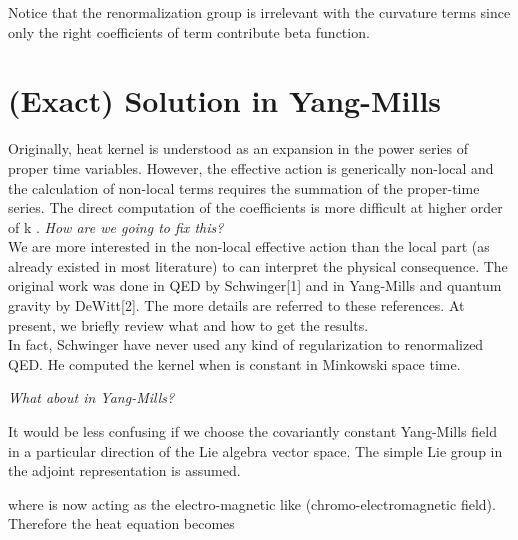 \documentclass[a4paper,12 pt]{article}
\begin{document}
Notice that the renormalization group is irrelevant with the
curvature terms since only the right coefficients of
\coordHE{} term contribute beta function.
\section{(Exact) Solution in Yang-Mills}
Originally, heat kernel is understood as an expansion in the power
series of proper time variables. However, the effective action is
generically non-local and the calculation of non-local terms
requires the summation of the proper-time series. The direct
computation of the coefficients \coordHE{} is more difficult at
higher order of k . \emph{How are we going to fix this?} \\We are
more interested in the non-local effective action than the local
part (as already existed in most literature) to can interpret the
physical consequence. The original work was done in QED by
Schwinger[1] and in Yang-Mills and quantum gravity by DeWitt[2].
The more details are referred to these references. At present, we
briefly review what and how to get the results.
\\In fact, Schwinger have never used any kind of regularization to
renormalized QED.  He computed the kernel \coordHE{} when \coordHE{} is constant in Minkowski space time.
\begin{center}
\coordHE{}
\end{center}
\begin{center}
\emph{What about in Yang-Mills?}
\end{center}
It would be less confusing if we choose the covariantly constant
Yang-Mills field \coordHE{} in a particular direction of
the Lie algebra vector space. The simple Lie group in the adjoint
representation is assumed.
\begin{center}
\coordHE{}
\end{center}
\begin{center}
 \coordHE{}
\end{center}
where \coordHE{} is now acting as the electro-magnetic like
(chromo-electromagnetic field).\\
Therefore the heat equation becomes
\end{document}
